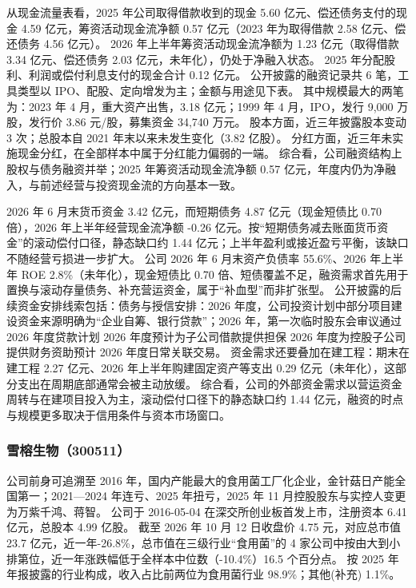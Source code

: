 从现金流量表看，2025 年公司取得借款收到的现金 5.60 亿元、偿还债务支付的现金 4.59 亿元，筹资活动现金流净额 0.57 亿元（2023 年为取得借款 2.58 亿元、偿还债务 4.56 亿元）。 2026 年上半年筹资活动现金流净额为 1.23 亿元（取得借款 3.34 亿元、偿还债务 2.03 亿元，未年化），仍处于净融入状态。 2025 年分配股利、利润或偿付利息支付的现金合计 0.12 亿元。 公开披露的融资记录共 6 笔，工具类型以 IPO、配股、定向增发为主；金额与用途见下表。 其中规模最大的两笔为：2023 年 4 月，重大资产出售，3.18 亿元；1999 年 4 月，IPO，发行 9,000 万股，发行价 3.86 元/股，募集资金 34,740 万元。 股本方面，近三年披露股本变动 3 次；总股本自 2021 年末以来未发生变化（3.82 亿股）。 分红方面，近三年未实施现金分红，在全部样本中属于分红能力偏弱的一端。 综合看，公司融资结构上股权与债务融资并举；2025 年筹资活动现金流净额 0.57 亿元，年度内仍为净融入，与前述经营与投资现金流的方向基本一致。

 2026 年 6 月末货币资金 3.42 亿元，而短期债务 4.87 亿元（现金短债比 0.70 倍），2026 年上半年经营现金流净额 -0.26 亿元。按“短期债务减去账面货币资金”的滚动偿付口径，静态缺口约 1.44 亿元；上半年盈利或接近盈亏平衡，该缺口不随经营亏损进一步扩大。 公司 2026 年 6 月末资产负债率 55.6\%、2026 年上半年 ROE 2.8\%（未年化），现金短债比 0.70 倍、短债覆盖不足，融资需求首先用于置换与滚动存量债务、补充营运资金，属于“补血型”而非扩张型。 公开披露的后续资金安排线索包括：债务与授信安排：2026 年度，公司投资计划中部分项目建设资金来源明确为“企业自筹、银行贷款”；2026 年，第一次临时股东会审议通过 2026 年度贷款计划 2026 年度预计为子公司借款提供担保 2026 年度为控股子公司提供财务资助预计 2026 年度日常关联交易。 资金需求还要叠加在建工程：期末在建工程 2.27 亿元、2026 年上半年购建固定资产等支出 0.29 亿元（未年化），这部分支出在周期底部通常会被主动放缓。 综合看，公司的外部资金需求以营运资金周转与在建项目投入为主，滚动偿付口径下的静态缺口约 1.44 亿元，融资的时点与规模更多取决于信用条件与资本市场窗口。




\subsubsection{雪榕生物（300511）}
\label{co:300511}

 公司前身可追溯至 2016 年，国内产能最大的食用菌工厂化企业，金针菇日产能全国第一；2021—2024 年连亏、2025 年扭亏，2025 年 11 月控股股东与实控人变更为万紫千鸿、蒋智。 公司于 2016-05-04 在深交所创业板首发上市，注册资本 6.41 亿元，总股本 4.99 亿股。 截至 2026 年 10 月 12 日收盘价 4.75 元，对应总市值 23.7 亿元，近一年-26.8\%，总市值在三级行业“食用菌”的 4 家公司中按由大到小排第位，近一年涨跌幅低于全样本中位数（-10.4\%）16.5 个百分点。 按 2025 年年报披露的行业构成，收入占比前两位为食用菌行业 98.9\%；其他(补充) 1.1\%。

